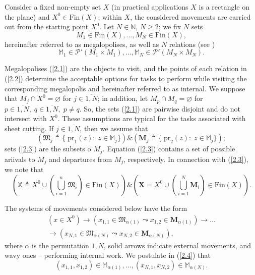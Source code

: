 
Consider a fixed non-empty set
$X$
(in practical applications
\cite{4}
$X$
is a rectangle on the plane)
and $X^0 \in \mathrm{Fin}(X)$;
within $ X $, the considered movements are carried out
from the starting point
$ X ^ 0 $.
Let $N \in \mathbb{N}$,
$N\ge 2$;
we fix $N$ sets
\begin{equation}\label{2.1}
M_1 \in \mathrm{Fin}(X),...,M_N \in \mathrm{Fin}(X),
\end{equation}
hereinafter referred to as megalopolises,
as well as
$N$
relations
(see \cite[chapter II, $\S$4]{15})
\begin{equation}\label{2.2}
\mathbb{M}_1 \in \mathcal{P}'(M_1 \times M_1), \dots ,
    \mathbb{M}_N \in \mathcal{P}'(M_N \times M_N).
\end{equation}

Megalopolises (\ref{2.1})
are the objects to visit,
and the points of each relation in (\ref{2.2})
determine the acceptable options for tasks to perform
while visiting the corresponding megalopolis
and hereinafter referred to as internal.
We suppose that
$M_j \cap X^0 = \varnothing$
for
$j \in \overline{1,N}$;
in addition, let
$M_p \cap M_q = \varnothing$
for
$p \in \overline{1,N},\;q \in \overline{1,N},\;p \ne q$.
So,
the sets (\ref{2.1})
are pairwise disjoint and do not intersect with
$ X ^ 0 $.
These assumptions are typical for the tasks
associated with sheet cutting.
If $j \in \overline{1,N}$,
then we assume that
\begin{equation}\label{2.3}
    (\mathfrak{M}_j {\triangleq}
    \{\;\mathrm{pr}_1(z):\;z \in \mathbb{M}_j\})
    \& (\mathbf{M}_j {\triangleq}
    \{\;\mathrm{pr}_2(z):\;z \in \mathbb{M}_j\})
    ;
\end{equation}
sets (\ref{2.3})
are the subsets o
$M_j$.
Equation (\ref{2.3})
contains a set of possible ariivals to
$M_j$
and departures from $M_j$,
respectively.
In connection with
 (\ref{2.3}),
we note that
$$
(\mathbb{X} {\triangleq} X^0 \cup
(\bigcup\limits_{i=1}^n \mathfrak{M}_i) \in \mathrm{Fin}(X))
\& (\mathbf{X} = X^0 \cup (\bigcup\limits_{i=1}^N \mathbf{M}_i) \in \mathrm{Fin}(X)).
$$

The systems of movements considered below have the form
\begin{equation}\label{2.4}
  \begin{aligned}
    (x \in X^0)
    \to
    (x_{1,1} \in \mathfrak{M}_{\alpha(1)} \leadsto x_{1,2} \in \mathbf{M}_{\alpha(1)})
    \to \dots \\
    \to
    (x_{N,1} \in \mathfrak{M}_{\alpha(N)} \leadsto x_{N,2} \in \mathbf{M}_{\alpha(N)}),
  \end{aligned}
\end{equation}
where
$\alpha$ is the permutation $\overline{1,N}$,
solid arrows indicate external movements,
and wavy ones -- performing internal work.
We postulate in (\ref{2.4}) that
\begin{equation}\label{2.5}
  (x_{1,1},x_{1,2}) \in \mathbb{M}_{\alpha(1)},
  \dots,
  (x_{N,1},x_{N,2}) \in \mathbb{M}_{\alpha(N)}.
\end{equation}


